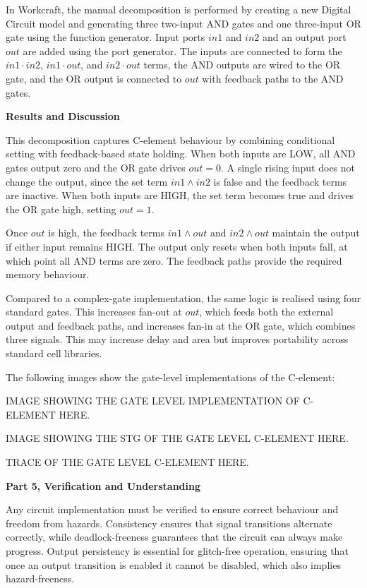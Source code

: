 \documentclass[a4paper,12pt]{article}
\begin{document}
In Workcraft, the manual decomposition is performed by creating a new Digital Circuit model and generating three two-input AND gates and one three-input OR gate using the function generator. Input ports $in1$ and $in2$ and an output port $out$ are added using the port generator. The inputs are connected to form the $in1\cdot in2$, $in1\cdot out$, and $in2\cdot out$ terms, the AND outputs are wired to the OR gate, and the OR output is connected to $out$ with feedback paths to the AND gates.

\textbf{Results and Discussion}

This decomposition captures C-element behaviour by combining conditional setting with feedback-based state holding. When both inputs are LOW, all AND gates output zero and the OR gate drives $out=0$. A single rising input does not change the output, since the set term $in1\land in2$ is false and the feedback terms are inactive. When both inputs are HIGH, the set term becomes true and drives the OR gate high, setting $out=1$.

Once $out$ is high, the feedback terms $in1\land out$ and $in2\land out$ maintain the output if either input remains HIGH. The output only resets when both inputs fall, at which point all AND terms are zero. The feedback paths provide the required memory behaviour.

Compared to a complex-gate implementation, the same logic is realised using four standard gates. This increases fan-out at $out$, which feeds both the external output and feedback paths, and increases fan-in at the OR gate, which combines three signals. This may increase delay and area but improves portability across standard cell libraries.

The following images show the gate-level implementations of the C-element:

\begin{large}
IMAGE SHOWING THE GATE LEVEL IMPLEMENTATION OF C-ELEMENT HERE.
\end{large}

\begin{large}
IMAGE SHOWING THE STG OF THE GATE LEVEL C-ELEMENT HERE.
\end{large}

\begin{large}
TRACE OF THE GATE LEVEL C-ELEMENT HERE.
\end{large}

\textbf{Part 5, Verification and Understanding}

Any circuit implementation must be verified to ensure correct behaviour and freedom from hazards. Consistency ensures that signal transitions alternate correctly, while deadlock-freeness guarantees that the circuit can always make progress. Output persistency is essential for glitch-free operation, ensuring that once an output transition is enabled it cannot be disabled, which also implies hazard-freeness.
\end{document}
